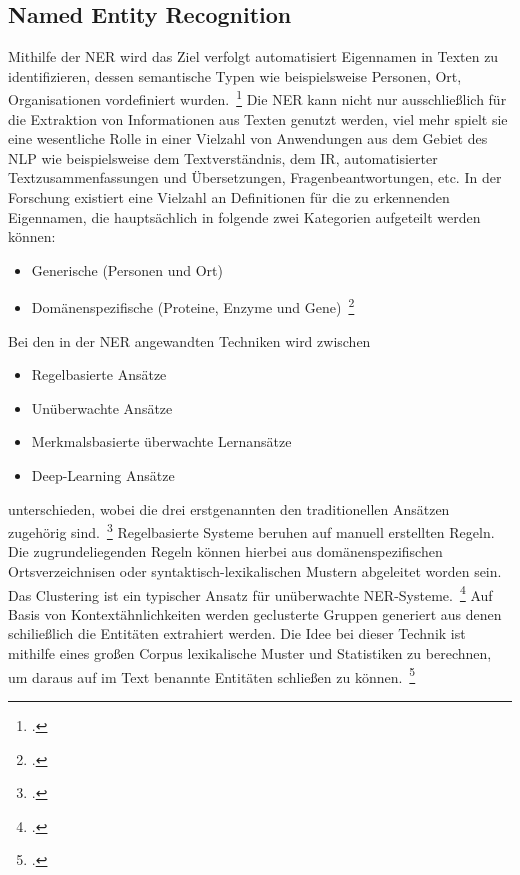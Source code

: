 \subsection{Named Entity Recognition} \label{NER}

Mithilfe der \ac{NER} wird das Ziel verfolgt automatisiert Eigennamen in Texten zu identifizieren,
dessen semantische Typen wie beispielsweise Personen, Ort, Organisationen vordefiniert wurden.~\footcite[\vglf]
[]{nadeau.2007}
Die \ac{NER} kann nicht nur ausschließlich für die Extraktion von Informationen aus Texten genutzt werden, viel mehr
spielt sie eine wesentliche Rolle in einer Vielzahl von Anwendungen aus dem Gebiet des \ac{NLP} wie beispielsweise dem
Textverständnis, dem \ac{IR}, automatisierter Textzusammenfassungen und Übersetzungen, Fragenbeantwortungen, etc.
In der Forschung existiert eine Vielzahl an Definitionen für die zu erkennenden Eigennamen, die hauptsächlich in
folgende zwei Kategorien aufgeteilt werden können:
\begin{itemize}
    \item Generische (\zb Personen und Ort)
    \item Domänenspezifische (\zb Proteine, Enzyme und Gene)~\footcite[\vglf][]{li.2018}
\end{itemize}
Bei den in der \ac{NER} angewandten Techniken wird zwischen
\begin{itemize}
    \item Regelbasierte Ansätze
    \item Unüberwachte Ansätze
    \item Merkmalsbasierte überwachte Lernansätze
    \item Deep-Learning Ansätze
\end{itemize}
unterschieden, wobei die drei erstgenannten den traditionellen Ansätzen zugehörig sind.~\footcite[\vglf][]
{li.2018}
Regelbasierte Systeme beruhen auf manuell erstellten Regeln.
Die zugrundeliegenden Regeln können hierbei \zb aus domänenspezifischen Ortsverzeichnisen oder syntaktisch-lexikalischen
Mustern abgeleitet worden sein.\newline
Das Clustering ist ein typischer Ansatz für unüberwachte \ac{NER}-Systeme.~\footcite[\vglf][ f.]{nadeau.2007}
Auf Basis von Kontextähnlichkeiten werden geclusterte Gruppen generiert aus denen schiließlich die
Entitäten extrahiert werden.
Die Idee bei dieser Technik ist mithilfe eines großen Corpus lexikalische Muster und Statistiken zu berechnen, um daraus
auf im Text benannte Entitäten schließen zu können.~\footcite[\vglf][]{li.2018}\newline
